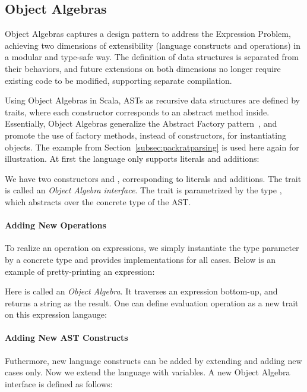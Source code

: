 \subsection{Object Algebras}\label{subsec:objectalgebras}
Object Algebras captures a design pattern to address the Expression Problem, achieving two dimensions of extensibility (language constructs and operations) in a modular and type-safe way. The definition of data structures is separated from their behaviors, and future extensions on both dimensions no longer require existing code to be modified, supporting separate compilation.

Using Object Algebras in Scala, ASTs as recursive data structures are defined by traits, where each constructor corresponds to an abstract method inside.
Essentially, Object Algebras generalize the {\sc Abstract Factory} pattern~\cite{}, and promote the use of factory methods, instead of constructors, for instantiating objects. The example from Section~\ref{subsec:packratparsing} is used here again for illustration.
At first the language only supports literals and additions:

We have two constructors  and , corresponding to literals and additions. The trait  is called an \textit{Object Algebra interface}. The trait is parametrized by the type
, which abstracts over the concrete type of the AST. 

\paragraph{Adding New Operations}
To realize an operation on expressions, we simply instantiate the type parameter by a concrete type and
provides implementations for all cases. Below is an example of pretty-printing an expression:

Here  is called an \textit{Object Algebra}. It traverses an expression bottom-up, and returns a string as the result.
One can define evaluation operation as a new trait on this expression langauge:


\paragraph{Adding New AST Constructs}
Futhermore, new language constructs can be added by extending  and adding new cases only. Now we extend the language
with variables. A new Object Algebra interface  is defined as follows:


